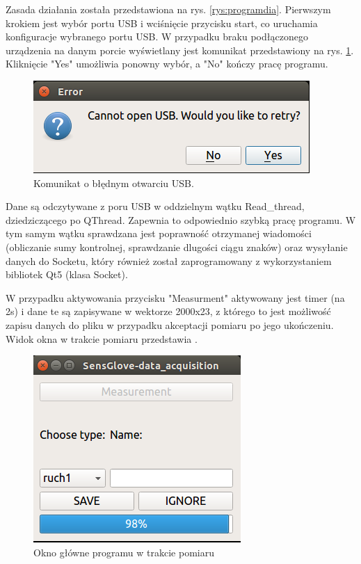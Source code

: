 \documentclass{article}
\begin{document}
Zasada działania została przedstawiona na rys. \ref{rys:programdia}. 
Pierwszym krokiem jest wybór portu USB i wciśnięcie przycisku start, co uruchamia konfiguracje wybranego portu USB. W przypadku braku podłączonego urządzenia na danym porcie wyświetlany jest komunikat przedstawiony na rys. \ref{rys:oknousb}. Kliknięcie "Yes" umożliwia ponowny wybór, a "No" kończy pracę programu.\\
\begin{figure}[h!]
    \begin{center}
    \includegraphics[scale=0.6]{oknousb.png}
    \caption{Komunikat o błędnym otwarciu USB.}
    \label{rys:oknousb}
    \end{center}
\end{figure}
Dane są odczytywane z poru USB w oddzielnym wątku Read\_thread, dziedziczącego po QThread. Zapewnia to odpowiednio szybką pracę programu. W tym samym wątku sprawdzana jest poprawność otrzymanej wiadomości (obliczanie sumy kontrolnej, sprawdzanie dlugości ciągu znaków) oraz wysyłanie danych do Socketu, który również został zaprogramowany z wykorzystaniem bibliotek Qt5 (klasa Socket).

W przypadku aktywowania przycisku "Measurment" aktywowany jest timer (na 2s) i dane te są zapisywane w wektorze 2000x23, z którego to jest możliwość zapisu danych do pliku w przypadku akceptacji pomiaru po jego ukończeniu. Widok okna w trakcie pomiaru przedstawia .
\begin{figure}[h!]
    \centering
    \includegraphics[scale=0.6]{oknopomiar.png}
    \caption{Okno główne programu w trakcie pomiaru}
    \label{rys:oknopomiar}
\end{figure}
\end{document}
